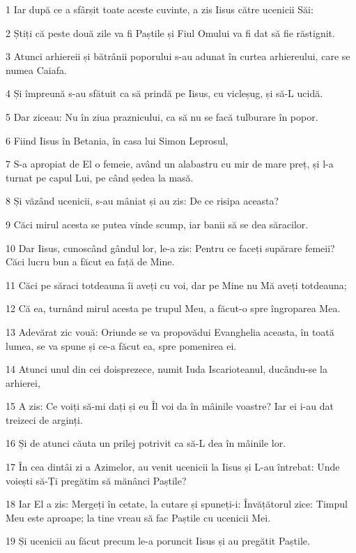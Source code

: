 \par 1 Iar după ce a sfârșit toate aceste cuvinte, a zis Iisus către ucenicii Săi:
\par 2 Știți că peste două zile va fi Paștile și Fiul Omului va fi dat să fie răstignit.
\par 3 Atunci arhiereii și bătrânii poporului s-au adunat în curtea arhiereului, care se numea Caiafa.
\par 4 Și împreună s-au sfătuit ca să prindă pe Iisus, cu vicleșug, și să-L ucidă.
\par 5 Dar ziceau: Nu în ziua praznicului, ca să nu se facă tulburare în popor.
\par 6 Fiind Iisus în Betania, în casa lui Simon Leprosul,
\par 7 S-a apropiat de El o femeie, având un alabastru cu mir de mare preț, și l-a turnat pe capul Lui, pe când ședea la masă.
\par 8 Și văzând ucenicii, s-au mâniat și au zis: De ce risipa aceasta?
\par 9 Căci mirul acesta se putea vinde scump, iar banii să se dea săracilor.
\par 10 Dar Iisus, cunoscând gândul lor, le-a zis: Pentru ce faceți supărare femeii? Căci lucru bun a făcut ea față de Mine.
\par 11 Căci pe săraci totdeauna îi aveți cu voi, dar pe Mine nu Mă aveți totdeauna;
\par 12 Că ea, turnând mirul acesta pe trupul Meu, a făcut-o spre îngroparea Mea.
\par 13 Adevărat zic vouă: Oriunde se va propovădui Evanghelia aceasta, în toată lumea, se va spune și ce-a făcut ea, spre pomenirea ei.
\par 14 Atunci unul din cei doisprezece, numit Iuda Iscarioteanul, ducându-se la arhierei,
\par 15 A zis: Ce voiți să-mi dați și eu Îl voi da în mâinile voastre? Iar ei i-au dat treizeci de arginți.
\par 16 Și de atunci căuta un prilej potrivit ca să-L dea în mâinile lor.
\par 17 În cea dintâi zi a Azimelor, au venit ucenicii la Iisus și L-au întrebat: Unde voiești să-Ți pregătim să mănânci Paștile?
\par 18 Iar El a zis: Mergeți în cetate, la cutare și spuneți-i: Învățătorul zice: Timpul Meu este aproape; la tine vreau să fac Paștile cu ucenicii Mei.
\par 19 Și ucenicii au făcut precum le-a poruncit Iisus și au pregătit Paștile.
